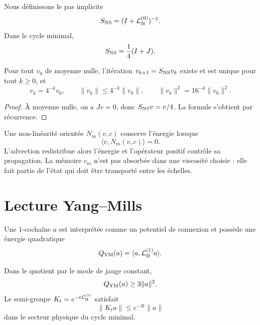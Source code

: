Nous définissons le pas implicite
\[
 S_{\rm NS}=(I+\mathcal L_{\rm H}^{(0)})^{-1}.
\]
Dans le cycle minimal,
\[
 S_{\rm NS}=\frac14(I+J).
\]

\begin{theorem}
\label{thm:contraccion-flujo-finito}
Pour tout \(v_0\) de moyenne nulle, l'itération
\(v_{k+1}=S_{\rm NS}v_k\) existe et est unique pour tout \(k\geq0\), et
\[
 v_k=4^{-k}v_0,
 \qquad
 \|v_k\|\leq4^{-k}\|v_0\|,
 \qquad
 \|v_k\|^2=16^{-k}\|v_0\|^2.
\]
\end{theorem}

\begin{proof}
À moyenne nulle, on a \(Jv=0\), donc
\(S_{\rm NS}v=v/4\). La formule s'obtient par récurrence.
\end{proof}

Une non-linéarité orientée \(N_m(v,c)\) conserve l'énergie lorsque
\[
 \langle v,N_m(v,c)\rangle=0.
\]
L'advection redistribue alors l'énergie et l'opérateur positif contrôle
sa propagation. La mémoire \(c_m\) n'est pas absorbée dans une viscosité choisie :
elle fait partie de l'état qui doit être transporté entre les échelles.

\begingroup
\setlength{\parskip}{0pt}
\setlength{\abovedisplayskip}{.25\baselineskip}
\setlength{\belowdisplayskip}{.25\baselineskip}
\setlength{\abovedisplayshortskip}{.12\baselineskip}
\setlength{\belowdisplayshortskip}{.18\baselineskip}
\section{Lecture Yang--Mills}

Une \(1\)-cochaîne \(a\) est interprétée comme un potentiel de connexion et possède
une énergie quadratique
\[
 Q_{\rm YM}(a)=\langle a,\mathcal L_{\rm H}^{(1)}a\rangle.
\]

\begin{theorem}
\label{thm:coercividad-gap-gauge-finito}
Dans le quotient par le mode de jauge constant,
\[
 Q_{\rm YM}(a)\geq3\|a\|^2.
\]
Le semi-groupe \(K_t=e^{-t\mathcal L_{\rm H}^{(1)}}\) satisfait
\[
 \|K_ta\|\leq e^{-3t}\|a\|
\]
dans le secteur physique du cycle minimal.
\end{theorem}

